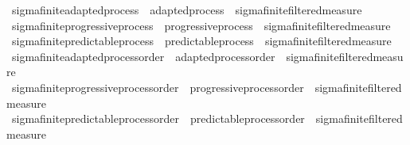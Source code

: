 \begin{isabellebody}
%
\isadelimdocument
%
\endisadelimdocument
%
\isatagdocument
%
\isamarkuptrue%
%
\endisatagdocument
{\isafolddocument}%
%
\isadelimdocument
%
\endisadelimdocument
{}\isamarkupfalse%
\ sigma{\isacharunderscore}{\kern0pt}finite{\isacharunderscore}{\kern0pt}adapted{\isacharunderscore}{\kern0pt}process\ {\isacharequal}{\kern0pt}\ adapted{\isacharunderscore}{\kern0pt}process\ {\isacharplus}{\kern0pt}\ sigma{\isacharunderscore}{\kern0pt}finite{\isacharunderscore}{\kern0pt}filtered{\isacharunderscore}{\kern0pt}measure\isanewline
{}\isamarkupfalse%
\ sigma{\isacharunderscore}{\kern0pt}finite{\isacharunderscore}{\kern0pt}progressive{\isacharunderscore}{\kern0pt}process\ {\isacharequal}{\kern0pt}\ progressive{\isacharunderscore}{\kern0pt}process\ {\isacharplus}{\kern0pt}\ sigma{\isacharunderscore}{\kern0pt}finite{\isacharunderscore}{\kern0pt}filtered{\isacharunderscore}{\kern0pt}measure\isanewline
{}\isamarkupfalse%
\ sigma{\isacharunderscore}{\kern0pt}finite{\isacharunderscore}{\kern0pt}predictable{\isacharunderscore}{\kern0pt}process\ {\isacharequal}{\kern0pt}\ predictable{\isacharunderscore}{\kern0pt}process\ {\isacharplus}{\kern0pt}\ sigma{\isacharunderscore}{\kern0pt}finite{\isacharunderscore}{\kern0pt}filtered{\isacharunderscore}{\kern0pt}measure\isanewline
\isanewline
{}\isamarkupfalse%
\ sigma{\isacharunderscore}{\kern0pt}finite{\isacharunderscore}{\kern0pt}adapted{\isacharunderscore}{\kern0pt}process{\isacharunderscore}{\kern0pt}order\ {\isacharequal}{\kern0pt}\ adapted{\isacharunderscore}{\kern0pt}process{\isacharunderscore}{\kern0pt}order\ {\isacharplus}{\kern0pt}\ sigma{\isacharunderscore}{\kern0pt}finite{\isacharunderscore}{\kern0pt}filtered{\isacharunderscore}{\kern0pt}measure\isanewline
{}\isamarkupfalse%
\ sigma{\isacharunderscore}{\kern0pt}finite{\isacharunderscore}{\kern0pt}progressive{\isacharunderscore}{\kern0pt}process{\isacharunderscore}{\kern0pt}order\ {\isacharequal}{\kern0pt}\ progressive{\isacharunderscore}{\kern0pt}process{\isacharunderscore}{\kern0pt}order\ {\isacharplus}{\kern0pt}\ sigma{\isacharunderscore}{\kern0pt}finite{\isacharunderscore}{\kern0pt}filtered{\isacharunderscore}{\kern0pt}measure\isanewline
{}\isamarkupfalse%
\ sigma{\isacharunderscore}{\kern0pt}finite{\isacharunderscore}{\kern0pt}predictable{\isacharunderscore}{\kern0pt}process{\isacharunderscore}{\kern0pt}order\ {\isacharequal}{\kern0pt}\ predictable{\isacharunderscore}{\kern0pt}process{\isacharunderscore}{\kern0pt}order\ {\isacharplus}{\kern0pt}\ sigma{\isacharunderscore}{\kern0pt}finite{\isacharunderscore}{\kern0pt}filtered{\isacharunderscore}{\kern0pt}measure\isanewline

\end{isabellebody}
